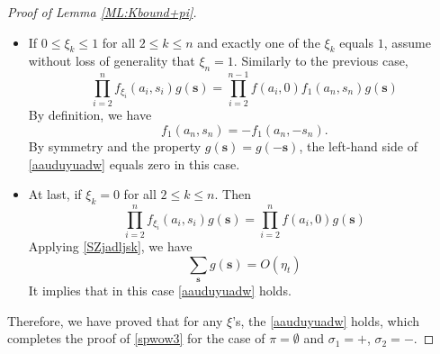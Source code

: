 \documentclass[10pt,reqno]{article}
\theoremstyle{plain} %
\theoremstyle{remark}
\numberwithin{equation}{section}
\begin{document}
\begin{proof}[Proof of Lemma  \ref{ML:Kbound+pi}]
\begin{itemize}
    \item If $0\le \xi_k\le 1$ for all $2\le k\le n$ and exactly one of the $\xi_k$ equals $1$, assume without loss of generality that $\xi_n=1$. Similarly to the previous case, 
$$
   \prod_{i=2}^nf_{\xi_i}(a_i, s_i)g(\textbf{s})=
\prod_{i=2}^{n-1}f(a_i,0) f_{1}(a_n,s_n)  g(\textbf{s})
    $$
By definition, we have  
$$
f_{1}(a_n,s_n) =-f_{1}(a_n,-s_n). 
$$
By symmetry and the property $g(\textbf{s})=g(-\textbf{s})$,  the left-hand side of \eqref{aauduyuadw} equals zero in this case. 
    \item At last, if  $\xi_k=0$ for all $2\le k\le n$. Then 
    $$
    \prod_{i=2}^nf_{\xi_i}(a_i, s_i)g(\textbf{s})=
  \prod_{i=2}^{n }f(a_i,0)   g(\textbf{s})
$$
Applying \eqref{SZjadljsk}, we have 
$$
 \sum_{\textbf{s}}g(\textbf{s})=O(\eta_t)
$$
 It implies that in this case \eqref{aauduyuadw} holds. 
\end{itemize}

Therefore, we have proved that for any $\xi$'s, the \eqref{aauduyuadw} holds, which completes the proof of \eqref{spwow3} for the case of $\pi=\emptyset$ and $\sigma_1=+$, $\sigma_2=-$. 

\bigskip


\end{proof}
\end{document}
